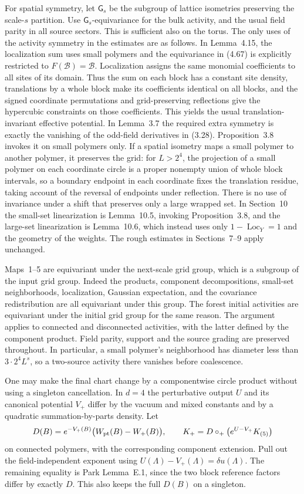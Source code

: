 \documentclass[11pt]{article}
\begin{document}
For spatial symmetry, let \(\mathsf G_s\) be the subgroup of
lattice isometries preserving the scale-\(s\) partition.
Use \(\mathsf G_s\)-equivariance for the bulk activity, and
the usual field parity in all source sectors. This is sufficient
also on the torus. The only uses of the activity symmetry
in the estimates are as follows. In Lemma~4.15, the localization
sum uses small polymers and the equivariance in (4.67) is
explicitly restricted to \(F(\mathcal B)=\mathcal B\).
Localization assigns the same monomial coefficients to all
sites of its domain. Thus the sum on each block has a constant
site density, translations by a whole block make its
coefficients identical on all blocks, and the signed
coordinate permutations and grid-preserving reflections give
the hypercubic constraints on those coefficients. This yields
the usual translation-invariant effective potential.
In Lemma~3.7 the required extra symmetry is exactly the
vanishing of the odd-field derivatives in (3.28).
Proposition~3.8 invokes it on small polymers only. If a
spatial isometry maps a small polymer to another polymer,
it preserves the grid: for \(L>2^4\), the projection of
a small polymer on each coordinate circle is a proper
nonempty union of whole block intervals, so a boundary
endpoint in each coordinate fixes the translation residue,
taking account of the reversal of endpoints under reflection.
There is no use of invariance under a shift that preserves
only a large wrapped set. In Section~10 the small-set
linearization is Lemma~10.5, invoking Proposition~3.8, and
the large-set linearization is Lemma~10.6, which instead
uses only \(1-\operatorname{Loc}_Y=1\) and the geometry
of the weights. The rough estimates in Sections~7--9
apply unchanged.

Maps~1--5 are equivariant under the next-scale grid
group, which is a subgroup of the input grid group.
Indeed the products, component decompositions, small-set
neighborhoods, localization, Gaussian expectation,
and the covariance redistribution are all equivariant
under this group. The forest initial activities are
equivariant under the initial grid group for the same
reason. The argument applies to connected and disconnected
activities, with the latter defined by the component
product. Field parity, support and the source grading
are preserved throughout. In particular, a small polymer's
neighborhood has diameter less than \(3\cdot2^4 L^s\),
so a two-source activity there vanishes before coalescence.

One may make the final chart change by a componentwise
circle product without using a singleton cancellation.
In \(d=4\) the perturbative output \(U\) and its canonical
potential \(V_+\) differ by the vacuum and mixed constants
and by a quadratic summation-by-parts density. Let
\[
 D(B)=e^{-V_+(B)}\bigl(W_{\rm pt}(B)-W_+(B)\bigr),\qquad
 K_+=D\circ_+\bigl(e^{U-V_+}K_{(5)}\bigr)
\]
on connected polymers, with the corresponding component
extension. Pull out the field-independent exponent using
\(U(\Lambda)-V_+(\Lambda)=\delta u(\Lambda)\).
The remaining equality is Park Lemma~E.1,
since the two block reference factors differ by exactly
\(D\). This also keeps the full \(D(B)\) on a singleton.
\end{document}
